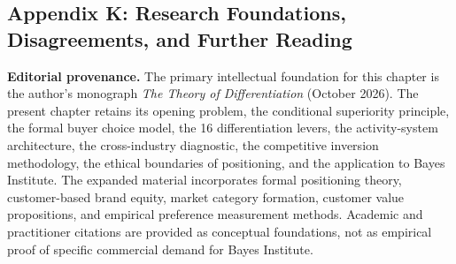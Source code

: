 \subsection*{Appendix K: Research Foundations, Disagreements, and Further Reading}

\textbf{Editorial provenance.} The primary intellectual foundation for this chapter is the author's monograph \emph{The Theory of Differentiation} (October 2026). The present chapter retains its opening problem, the conditional superiority principle, the formal buyer choice model, the 16 differentiation levers, the activity-system architecture, the cross-industry diagnostic, the competitive inversion methodology, the ethical boundaries of positioning, and the application to Bayes Institute. The expanded material incorporates formal positioning theory, customer-based brand equity, market category formation, customer value propositions, and empirical preference measurement methods. Academic and practitioner citations are provided as conceptual foundations, not as empirical proof of specific commercial demand for Bayes Institute.

